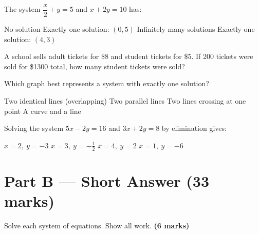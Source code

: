 \documentclass[addpoints]{exam}
\begin{document}
\begin{questions}
\question[1] The system $\dfrac{x}{2} + y = 5$ and $x + 2y = 10$ has:
\begin{choices}
    \choice No solution
    \choice Exactly one solution: $(0, 5)$
    \correctchoice Infinitely many solutions
    \choice Exactly one solution: $(4, 3)$
\end{choices}
\vspace{3mm}

\question[1] A school sells adult tickets for \$8 and student tickets for \$5. If 200 tickets were sold for \$1300 total, how many student tickets were sold?
\begin{choices}
\end{choices}
\vspace{3mm}

\question[1] Which graph best represents a system with exactly one solution?
\begin{choices}
    \choice Two identical lines (overlapping)
    \choice Two parallel lines
    \correctchoice Two lines crossing at one point
    \choice A curve and a line
\end{choices}
\vspace{3mm}

\question[1] Solving the system $5x - 2y = 16$ and $3x + 2y = 8$ by elimination gives:
\begin{choices}
    \choice $x = 2,\ y = -3$
    \correctchoice $x = 3,\ y = -\tfrac{1}{2}$
    \choice $x = 4,\ y = 2$
    \choice $x = 1,\ y = -6$
\end{choices}
\vspace{5mm}

\section*{Part B --- Short Answer (33 marks)}

\question Solve each system of equations. Show all work. \textbf{(6 marks)}

\end{questions}
\end{document}
